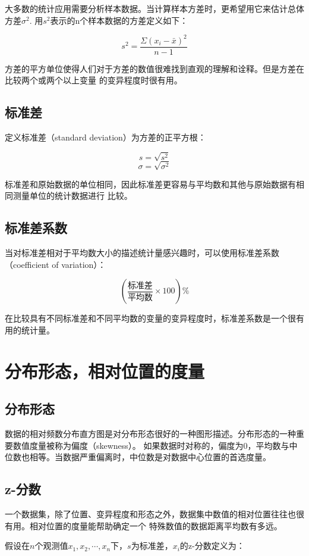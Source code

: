 \documentclass[a4paper]{ctexrep}
\begin{document}
大多数的统计应用需要分析样本数据。当计算样本方差时，更希望用它来估计总体方差$\sigma^{2}$.
用$s^{2}$表示的n个样本数据的方差定义如下：

\[s^{2} = \frac{\Sigma(x_{i} - \bar{x})^{2}}{n - 1}\]

方差的平方单位使得人们对于方差的数值很难找到直观的理解和诠释。但是方差在比较两个或两个以上变量
的变异程度时很有用。

\subsection{标准差}
定义标准差（standard deviation）为方差的正平方根：

\[s = \sqrt{s^{2}}\]
\[\sigma = \sqrt{\sigma^{2}}\]

标准差和原始数据的单位相同，因此标准差更容易与平均数和其他与原始数据有相同测量单位的统计数据进行
比较。

\subsection{标准差系数}
当对标准差相对于平均数大小的描述统计量感兴趣时，可以使用标准差系数（coefficient of variation）：

\[(\frac{\mbox{标准差}}{\mbox{平均数}}\times 100)\%\]

在比较具有不同标准差和不同平均数的变量的变异程度时，标准差系数是一个很有用的统计量。


\section{分布形态，相对位置的度量}

\subsection{分布形态}
数据的相对频数分布直方图是对分布形态很好的一种图形描述。分布形态的一种重要数值度量被称为偏度（skewness）。
如果数据时对称的，偏度为0，平均数与中位数也相等。当数据严重偏离时，中位数是对数据中心位置的首选度量。

\subsection{z-分数}
一个数据集，除了位置、变异程度和形态之外，数据集中数值的相对位置往往也很有用。相对位置的度量能帮助确定一个
特殊数值的数据距离平均数有多远。

假设在$n$个观测值$x_{1}, x_{2}, \cdots, x_{n}$下，$s$为标准差，$x_{i}$的z-分数定义为：
\end{document}

